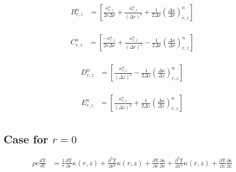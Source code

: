 \documentclass[12pt]{article}
\begin{document}
		\begin{equation}
		\begin{aligned}
		B^n_{r, z} &= \left [\frac{\kappa^n_{r, z}}{2r\Delta r} + \frac{\kappa^n_{r, z}}{(\Delta r)^2} + \frac{1}{2\Delta r}(\frac{\Delta\kappa}{\Delta r})^n_{r, z} \right ] \\
		\end{aligned}
		\end{equation}
		
		\begin{equation}
		\begin{aligned}
		C^n_{r, z} &= \left [\frac{-\kappa^n_{r, z}}{2r\Delta r} + \frac{\kappa^n_{r, z}}{(\Delta r)^2} - \frac{1}{2\Delta r}(\frac{\Delta\kappa}{\Delta r})^n_{r, z} \right ] \\
		\end{aligned}
		\end{equation}
		
		\begin{equation}
		\begin{aligned}
		D^n_{r, z} &= \left [\frac{\kappa^n_{r, z}}{(\Delta z)^2} - \frac{1}{2\Delta z}(\frac{\Delta\kappa}{\Delta z})^n_{r, z}  \right ] \\
		\end{aligned}
		\end{equation}
		
		\begin{equation}
		\begin{aligned}
		E^n_{r, z} &= \left [ \frac{\kappa^n_{r, z}}{(\Delta z)^2} + \frac{1}{2\Delta z}(\frac{\Delta\kappa}{\Delta z})^n_{r, z} \right ] \\
		\end{aligned}
		\end{equation}

    \subsection{Case for $r=0$}
      \begin{equation}
        \begin{aligned}
          \rho c \frac{d\mathrm{T}}{dt} &= \frac{1}{r} \frac{\partial\mathrm{T}}{\partial r}\kappa(r, z) + \frac{\partial^2\mathrm{T}}{\partial r^2}\kappa(r, z)  + \frac{\partial\mathrm{T}}{\partial r} \frac{\partial\mathrm{\kappa}}{\partial r}  + \frac{\partial^2\mathrm{T}}{\partial z^2}\kappa(r, z) + \frac{\partial\mathrm{T}}{\partial z}\frac{\partial\mathrm{\kappa}}{\partial z} \\
        \end{aligned}
      \end{equation}	
\end{document}

